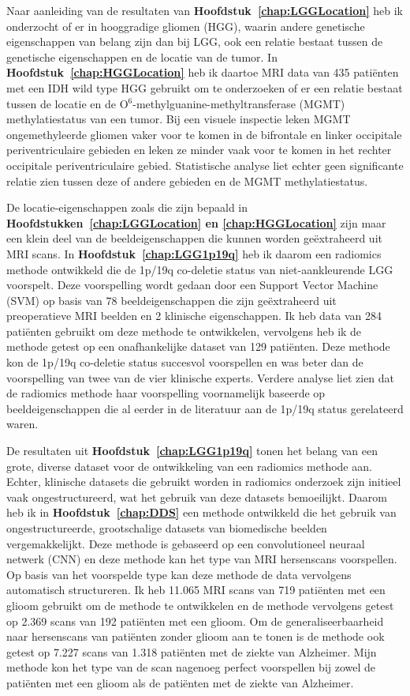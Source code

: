Naar aanleiding van de resultaten van \textbf{Hoofdstuk~\ref{chap:LGGLocation}} heb ik onderzocht of er in hooggradige gliomen (HGG), waarin andere genetische eigenschappen van belang zijn dan bij LGG, ook een relatie bestaat tussen de genetische eigenschappen en de locatie van de tumor.
In \textbf{Hoofdstuk~\ref{chap:HGGLocation}} heb ik daartoe MRI data van 435 pati{\"e}nten met een IDH wild type HGG gebruikt om te onderzoeken of er een relatie bestaat tussen de locatie en de O$^6$-methylguanine-methyltransferase (MGMT) methylatiestatus van een tumor.
Bij een visuele inspectie leken  MGMT ongemethyleerde gliomen vaker voor te komen in de bifrontale en linker occipitale periventriculaire gebieden en leken ze minder vaak voor te komen in het rechter occipitale periventriculaire gebied.
Statistische analyse liet echter geen significante relatie zien tussen deze of andere gebieden en de MGMT methylatiestatus.

De locatie-eigenschappen zoals die zijn bepaald in \textbf{Hoofdstukken~\ref{chap:LGGLocation} en \ref{chap:HGGLocation}} zijn maar een klein deel van de beeldeigenschappen die kunnen worden ge{\"e}xtraheerd uit MRI scans.
In \textbf{Hoofdstuk~\ref{chap:LGG1p19q}} heb ik daarom een radiomics methode ontwikkeld die de 1p/19q co-deletie status van niet-aankleurende LGG voorspelt.
Deze voorspelling wordt gedaan door een Support Vector Machine (SVM) op basis van 78 beeldeigenschappen die zijn ge{\"e}xtraheerd uit preoperatieve MRI beelden en 2 klinische eigenschappen.
Ik heb data van 284 pati{\"e}nten gebruikt om deze methode te ontwikkelen, vervolgens heb ik de methode getest op een onafhankelijke dataset van 129 pati{\"e}nten.
Deze methode kon de 1p/19q co-deletie status succesvol voorspellen en was beter dan de voorspelling van twee van de vier klinische experts.
Verdere analyse liet zien dat de radiomics methode haar voorspelling voornamelijk baseerde op beeldeigenschappen die al eerder in de literatuur aan de 1p/19q status gerelateerd waren.

De resultaten uit \textbf{Hoofdstuk~\ref{chap:LGG1p19q}} tonen het belang van een grote, diverse dataset voor de ontwikkeling van een radiomics methode aan.
Echter, klinische datasets die gebruikt worden in radiomics onderzoek zijn initieel vaak ongestructureerd, wat het gebruik van deze datasets bemoeilijkt.
Daarom heb ik in \textbf{Hoofdstuk~\ref{chap:DDS}} een methode ontwikkeld die het gebruik van ongestructureerde, grootschalige datasets van biomedische beelden vergemakkelijkt.
Deze methode is gebaseerd op een convolutioneel neuraal netwerk (CNN) en deze methode kan het type van  MRI hersenscans voorspellen.
Op basis van het voorspelde type kan deze methode de data vervolgens automatisch structureren.
Ik heb 11.065 MRI scans van 719 pati{\"e}nten met een glioom gebruikt om de methode te ontwikkelen en de methode vervolgens getest op 2.369 scans van 192 pati{\"e}nten met een glioom.
Om de generaliseerbaarheid naar hersenscans van pati{\"e}nten zonder glioom aan te tonen is de methode ook getest op 7.227 scans van 1.318 pati{\"e}nten met de ziekte van Alzheimer.
Mijn methode kon het type van de scan nagenoeg perfect voorspellen bij zowel de pati{\"e}nten met een glioom als de pati{\"e}nten met de ziekte van Alzheimer.

